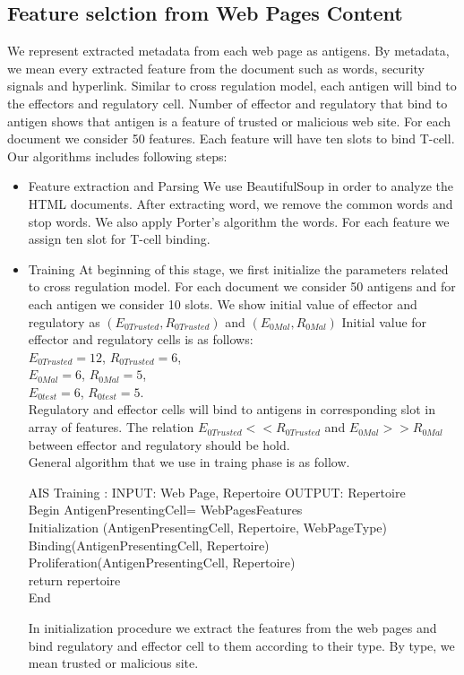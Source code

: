 \documentclass{llncs}
\begin{document}
\subsection{Feature selction from Web Pages Content}
We represent extracted metadata from each web page as antigens. By metadata, we mean every extracted feature from the document such as words, security signals and hyperlink. Similar to cross regulation model, each antigen will bind to the effectors and regulatory cell. Number of effector and regulatory that bind to antigen shows that antigen is a feature of trusted or malicious web site.
For each document we consider 50 features. Each feature will have ten slots to bind T-cell. \\
Our algorithms includes following steps: 
\begin{itemize}
\item Feature extraction and Parsing
We use BeautifulSoup in order to analyze the HTML documents.  After extracting word, we remove the common words and stop words.  We also apply  Porter’s algorithm the words. For each feature we assign ten slot for T-cell binding.
\item Training 
At beginning of this stage, we first initialize the parameters related to cross regulation model. For each document we consider 50 antigens and for each antigen we consider 10 slots. We show initial value of  effector and regulatory as $(E_{0Trusted}, R_{0Trusted })$ and $ (E_{0Mal}, R_{0Mal})$  Initial value for effector and regulatory cells is as follows:\\
$E_{0Trusted} =12$, $R_{0Trusted }=6$,\\ 
$E_{0Mal} =6$, $R_{0Mal }=5$, \\
$E_{0test} =6$, $R_{0test }=5$.\\
Regulatory and effector cells will bind to antigens in corresponding slot in array of features.  The relation $E_{0Trusted}<<R_{0Trusted}$ and $ E_{0Mal}>> R_{0Mal}$  between effector and regulatory should be hold.\\

General algorithm that we use in traing phase is as follow.\\
\begin{algorithmic}
\STATE AIS Training :  INPUT: Web Page, Repertoire OUTPUT: Repertoire\\
\STATE Begin 
\STATE  AntigenPresentingCell= WebPagesFeatures\\
\STATE Initialization (AntigenPresentingCell, Repertoire, WebPageType)\\
\STATE Binding(AntigenPresentingCell, Repertoire)\\
\STATE Proliferation(AntigenPresentingCell, Repertoire)\\
\STATE return repertoire\\
\STATE End\\
\end{algorithmic}
In initialization procedure we extract the features from  the web pages and bind regulatory and effector cell to them according to their type. By type, we mean trusted or malicious site.\\ 


\end{itemize}
\end{document}
